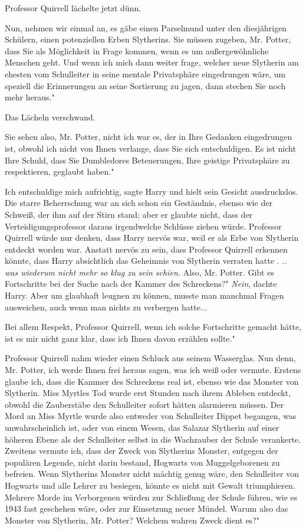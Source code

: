 Professor Quirrell lächelte jetzt dünn.

\glqq{}Nun, nehmen wir einmal an, es gäbe einen Parselmund unter den diesjährigen
Schülern, einen potenziellen Erben Slytherins. Sie müssen zugeben, Mr. Potter,
dass Sie als Möglichkeit in Frage kommen, wenn es um außergewöhnliche Menschen
geht. Und wenn ich mich dann weiter frage, welcher neue Slytherin am ehesten vom
Schulleiter in seine mentale Privatsphäre eingedrungen wäre, um speziell die
Erinnerungen an seine Sortierung zu jagen, dann stechen Sie noch mehr heraus."

Das Lächeln verschwand.

\glqq{}Sie sehen also, Mr. Potter, nicht ich war es, der in Ihre Gedanken
eingedrungen ist, obwohl ich nicht von Ihnen verlange, dass Sie sich
entschuldigen. Es ist nicht Ihre Schuld, dass Sie Dumbledores Beteuerungen, Ihre
geistige Privatsphäre zu respektieren, geglaubt haben."

\glqq{}Ich entschuldige mich aufrichtig\grqq{}, sagte Harry und hielt sein
Gesicht ausdruckslos. Die starre Beherrschung war an sich schon ein Geständnis,
ebenso wie der Schweiß, der ihm auf der Stirn stand; aber er glaubte nicht, dass
der Verteidigungsprofessor daraus irgendwelche Schlüsse ziehen würde. Professor
Quirrell würde nur denken, dass Harry nervös war, weil er als Erbe von Slytherin
entdeckt worden war. Anstatt nervös zu sein, dass Professor Quirrell erkennen
könnte, dass Harry absichtlich das Geheimnis von Slytherin verraten hatte .
\emph{.. was wiederum nicht mehr so klug zu sein schien.} \glqq{}Also, Mr.
Potter. Gibt es Fortschritte bei der Suche nach der Kammer des Schreckens?"
\emph{Nein}, dachte Harry. Aber um glaubhaft leugnen zu können, musste man
manchmal Fragen ausweichen, auch wenn man nichts zu verbergen hatte...

\glqq{}Bei allem Respekt, Professor Quirrell, wenn ich solche Fortschritte
gemacht hätte, ist es mir nicht ganz klar, dass ich Ihnen davon erzählen
sollte."

Professor Quirrell nahm wieder einen Schluck aus seinem Wasserglas. \glqq{}Nun
denn, Mr. Potter, ich werde Ihnen frei heraus sagen, was ich weiß oder vermute.
Erstens glaube ich, dass die Kammer des Schreckens real ist, ebenso wie das
Monster von Slytherin. Miss Myrtles Tod wurde erst Stunden nach ihrem Ableben
entdeckt, obwohl die Zauberstäbe den Schulleiter sofort hätten alarmieren
müssen. Der Mord an Miss Myrtle wurde also entweder von Schulleiter Dippet
begangen, was unwahrscheinlich ist, oder von einem Wesen, das Salazar Slytherin
auf einer höheren Ebene als der Schulleiter selbst in die Wachzauber der Schule
verankerte. Zweitens vermute ich, dass der Zweck von Slytherins Monster,
entgegen der populären Legende, nicht darin bestand, Hogwarts von
Muggelgeborenen zu befreien. Wenn Slytherins Monster nicht mächtig genug wäre,
den Schulleiter von Hogwarts und alle Lehrer zu besiegen, könnte es nicht mit
Gewalt triumphieren. Mehrere Morde im Verborgenen würden zur Schließung der
Schule führen, wie es 1943 fast geschehen wäre, oder zur Einsetzung neuer
Mündel. Warum also das Monster von Slytherin, Mr. Potter? Welchem wahren Zweck
dient es?"


